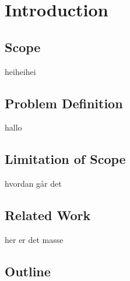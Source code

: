 \chapter{Introduction}
\section{Scope}
heiheihei
\section{Problem Definition}
hallo
\section{Limitation of Scope}
hvordan går det
\section{Related Work}
her er det masse
\section{Outline}